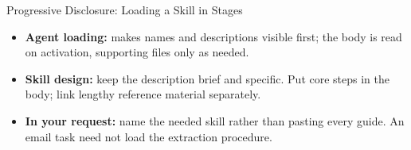 \begin{frame}{Progressive Disclosure: Loading a Skill in Stages}
\small
{}\par\smallskip
\begin{figure}\centering
{}
\end{figure}
\begin{itemize}
\item \textbf{Agent loading:}  makes names and descriptions visible first; the body is read on activation, supporting files only as needed.
\item \textbf{Skill design:} keep the description brief and specific. Put core steps in the body; link lengthy reference material separately.
\item \textbf{In your request:} name the needed skill rather than pasting every guide. An email task need not load the extraction procedure.
\end{itemize}
\end{frame}


